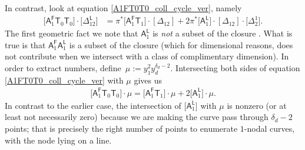 In contrast, look at equation \eqref{A1FT0T0_coll_cycle_ver}, namely
\begin{align*}
\bigl[\mathsf{A}_1^{\mathsf{F}}\mathsf{T}_0 \mathsf{T}_0\bigr] \cdot \bigl[\Delta^{\mathsf{L}}_{12}\bigr] &  =  \pi^*\bigl[\mathsf{A}_1^{\mathsf{F}}\mathsf{T}_1\bigr]\cdot [\Delta_{12}] + 2\pi^*\bigl[\mathsf{A}_1^{\mathsf{L}}\bigr]\cdot [\Delta_{12}]\cdot
\bigl[\Delta_{2}^1\bigr].
\end{align*}
The first geometric fact we note that $\mathsf{A}_1^{\mathsf{L}}$ is \emph{not} a subset of the
closure .
What is true is that $\mathsf{A}_1^{\mathsf{F}}\mathsf{A}_1^{\mathsf{L}}$
is a subset of the closure (which for dimensional reasons, does not contribute when
we intersect with a class of complimentary dimension). In order to extract
numbers, define~$\mu := y_1^2 y_d^{\delta_d-2}$.
Intersecting both sides of equation \eqref{A1FT0T0_coll_cycle_ver}
with $\mu$ gives us
\begin{align*}
\bigl[\mathsf{A}_1^{\mathsf{F}}\mathsf{T}_0 \mathsf{T}_0\bigr] \cdot \mu  =
\bigl[\mathsf{A}_1^{\mathsf{F}}\mathsf{T}_1\bigr]\cdot \mu + 2 \bigl[\mathsf{A}_1^{\mathsf{L}}\bigr]\cdot \mu.
\end{align*}
In contrast to the earlier case, the intersection of
$\bigl[\mathsf{A}_1^{\mathsf{L}}\bigr]$ with $\mu$ is nonzero (or at least not necessarily zero)
because we are making the curve pass through $\delta_d-2$ points; that is precisely the right number
of points to enumerate $1$-nodal curves, with the node lying on a line.

